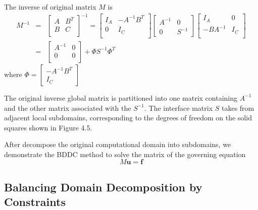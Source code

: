 The inverse of original matrix $ M $ is 
\begin{eqnarray} \label{eq:schur}
M^{-1} &=& \begin{bmatrix}
A & B^{T} \\
B & C\\
\end{bmatrix}^{-1} =
\begin{bmatrix}
I_{A} &  -A^{-1}B^{T} \\ 0 & I_{C}\\
\end{bmatrix} \begin{bmatrix}
A^{-1}& 0 \\ 0 & S^{-1}
\end{bmatrix}
\begin{bmatrix}
I_{A} & 0 \\ -BA^{-1} & I_{C} \\
\end{bmatrix}\\
&=& \begin{bmatrix}
A^{-1} & 0 \\ 0 & 0 \\
\end{bmatrix} + \Phi S^{-1} \Phi^{T}
\end{eqnarray}
where $ \Phi =\begin{bmatrix}
-A^{-1}B^{T} \\ I_{C}
\end{bmatrix} $

The original inverse global matrix  is partitioned into one matrix containing $ A^{-1} $ and the other matrix associated with the $ S^{-1} $. The interface matrix $ S $ takes from adjacent local subdomains, corresponding to the degrees of freedom on the solid squares shown in Figure 4.5. 

After decompose the original computational domain into subdomains, we demonstrate the BDDC method to solve the matrix of the governing equation 
\begin{equation}
{M}\mathbf{u} = \mathbf{f}
\end{equation}


\subsection{Balancing Domain Decomposition by Constraints}

